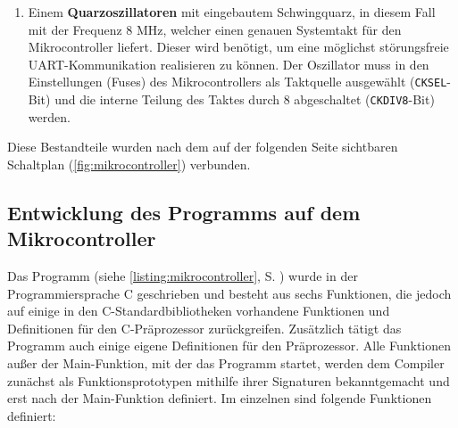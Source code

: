 \begin{enumerate}
\item Einem \textbf{Quarzoszillatoren} mit eingebautem Schwingquarz, in diesem Fall mit der Frequenz 8 MHz, welcher einen genauen Systemtakt für den Mikrocontroller liefert. Dieser wird benötigt, um eine möglichst störungsfreie UART-Kommunikation realisieren zu können. Der Oszillator muss in den Einstellungen (Fuses) des Mikrocontrollers als Taktquelle ausgewählt (\texttt{CKSEL}-Bit) und die interne Teilung des Taktes durch 8 abgeschaltet (\texttt{CKDIV8}-Bit) werden.
\end{enumerate}
Diese Bestandteile wurden nach dem auf der folgenden Seite sichtbaren Schaltplan (\autoref{fig:mikrocontroller}) verbunden.
\subsection{Entwicklung des Programms auf dem Mikrocontroller}
Das Programm (siehe \autoref{listing:mikrocontroller}, S. \pageref{listing:mikrocontroller}) wurde in der Programmiersprache C geschrieben und besteht aus sechs Funktionen, die jedoch auf einige in den C-Standardbibliotheken vorhandene Funktionen und Definitionen für den C-Präprozessor zurückgreifen. Zusätzlich tätigt das Programm auch einige eigene Definitionen für den Präprozessor. Alle Funktionen außer der Main-Funktion, mit der das Programm startet, werden dem Compiler zunächst als Funktionsprototypen mithilfe ihrer Signaturen bekanntgemacht und erst nach der Main-Funktion definiert. Im einzelnen sind folgende Funktionen definiert:
